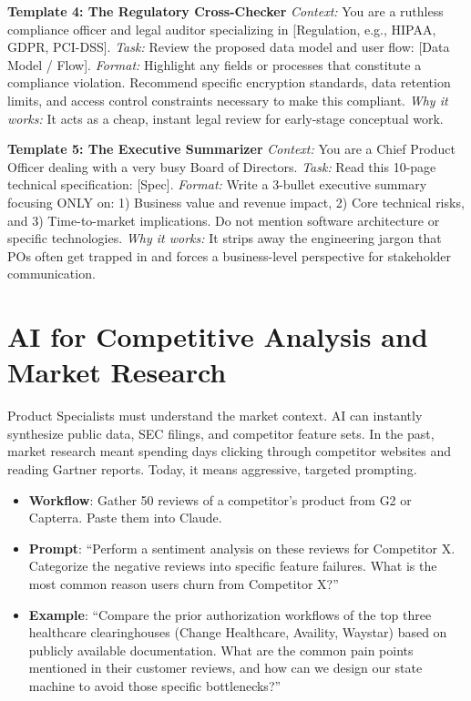 \textbf{Template 4: The Regulatory Cross-Checker} \emph{Context:} You
are a ruthless compliance officer and legal auditor specializing in
{[}Regulation, e.g., HIPAA, GDPR, PCI-DSS{]}. \emph{Task:} Review the
proposed data model and user flow: {[}Data Model / Flow{]}.
\emph{Format:} Highlight any fields or processes that constitute a
compliance violation. Recommend specific encryption standards, data
retention limits, and access control constraints necessary to make this
compliant. \emph{Why it works:} It acts as a cheap, instant legal review
for early-stage conceptual work.

\textbf{Template 5: The Executive Summarizer} \emph{Context:} You are a
Chief Product Officer dealing with a very busy Board of Directors.
\emph{Task:} Read this 10-page technical specification: {[}Spec{]}.
\emph{Format:} Write a 3-bullet executive summary focusing ONLY on: 1)
Business value and revenue impact, 2) Core technical risks, and 3)
Time-to-market implications. Do not mention software architecture or
specific technologies. \emph{Why it works:} It strips away the
engineering jargon that POs often get trapped in and forces a
business-level perspective for stakeholder communication.

\section{AI for Competitive Analysis and Market
Research}\label{ai-for-competitive-analysis-and-market-research}

Product Specialists must understand the market context. AI can instantly
synthesize public data, SEC filings, and competitor feature sets. In the
past, market research meant spending days clicking through competitor
websites and reading Gartner reports. Today, it means aggressive,
targeted prompting.

\begin{itemize}
\tightlist
\item
  \textbf{Workflow}: Gather 50 reviews of a competitor's product from G2
  or Capterra. Paste them into Claude.
\item
  \textbf{Prompt}: ``Perform a sentiment analysis on these reviews for
  Competitor X. Categorize the negative reviews into specific feature
  failures. What is the most common reason users churn from Competitor
  X?''
\item
  \textbf{Example}: ``Compare the prior authorization workflows of the
  top three healthcare clearinghouses (Change Healthcare, Availity,
  Waystar) based on publicly available documentation. What are the
  common pain points mentioned in their customer reviews, and how can we
  design our state machine to avoid those specific bottlenecks?''
\end{itemize}

